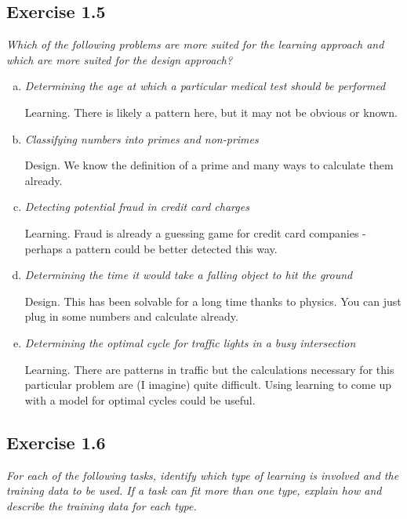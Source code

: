 \documentclass{article}
\begin{document}
\subsection*{Exercise 1.5}

\textit{Which of the following problems are more suited for the learning approach and which are more suited for the design approach?}

\begin{enumerate}[(a)]
	\item \textit{Determining the age at which a particular medical test should be performed}
	
    Learning. There is likely a pattern here, but it may not be obvious or known.
	
	\item \textit{Classifying numbers into primes and non-primes}

    Design. We know the definition of a prime and many ways to calculate them already.
	
	\item \textit{Detecting potential fraud in credit card charges}
	
    Learning. Fraud is already a guessing game for credit card companies - perhaps a pattern could be better detected this way.
	
	\item \textit{Determining the time it would take a falling object to hit the ground}
	
    Design. This has been solvable for a long time thanks to physics. You can just plug in some numbers and calculate already.
	
	\item \textit{Determining the optimal cycle for traffic lights in a busy intersection}

    Learning. There are patterns in traffic but the calculations necessary for this particular problem are (I imagine) quite difficult.
    Using learning to come up with a model for optimal cycles could be useful.

\end{enumerate}

\subsection*{Exercise 1.6}

\textit{For each of the following tasks, identify which type of learning is involved and the training data to be used. If a task can fit more than one type, explain how and describe the training data for each type.}
\end{document}
